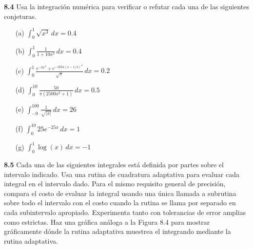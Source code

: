 \documentclass{article}
\begin{document}
\textbf{8.4} Usa la integración numérica para verificar o refutar cada una de las siguientes conjeturas.
\begin{itemize}
    \item[(a)] \(\int_0^1 \sqrt{x^3} \, dx = 0.4\)
    \item[(b)] \(\int_0^1 \frac{1}{1 + 10x^2} \, dx = 0.4\)
    \item[(c)] \(\int_0^1 \frac{e^{-9x^2} + e^{-1024(x - 1/4)^2}}{\sqrt{\pi}} \, dx = 0.2\)
    \item[(d)] \(\int_0^{10} \frac{50}{\pi(2500x^2 + 1)} \, dx = 0.5\)
    \item[(e)] \(\int_{-9}^{100} \frac{1}{\sqrt{|x|}} \, dx = 26\)
    \item[(f)] \(\int_0^{10} 25e^{-25x} \, dx = 1\)
    \item[(g)] \(\int_0^1 \log(x) \, dx = -1\)
\end{itemize}

\textbf{8.5} Cada una de las siguientes integrales está definida por partes sobre el intervalo indicado. Usa una rutina de cuadratura adaptativa para evaluar cada integral en el intervalo dado. Para el mismo requisito general de precisión, compara el costo de evaluar la integral usando una única llamada a subrutina sobre todo el intervalo con el costo cuando la rutina se llama por separado en cada subintervalo apropiado. Experimenta tanto con tolerancias de error amplias como estrictas. Haz una gráfica análoga a la Figura 8.4 para mostrar gráficamente dónde la rutina adaptativa muestrea el integrando mediante la rutina adaptativa.
\end{document}
